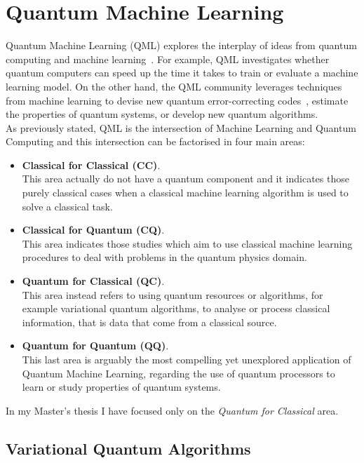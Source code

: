\chapter{Quantum Machine Learning}

Quantum Machine Learning (QML) explores the interplay of ideas from quantum computing and
machine learning~\cite{Biamonte_2017}.
For example, QML investigates whether quantum computers can speed up the time it takes
to train or evaluate a machine learning model. On the other hand, the QML community
leverages techniques from machine learning to devise new quantum error-correcting codes~\cite{Roffe_2019}, 
estimate the properties of quantum systems, or develop new quantum algorithms.\\
As previously stated, QML is the intersection of Machine Learning and Quantum Computing and this intersection can be 
factorised in four main areas:


\begin{itemize}
    \item \textbf{Classical for Classical (CC)}.\\ This area actually do not have a quantum component and 
    it indicates those purely classical cases when a classical machine learning algorithm is used to solve 
    a classical task.
    \item \textbf{Classical for Quantum (CQ)}.\\ This area indicates those studies which aim to use classical
    machine learning procedures to deal with problems in the quantum physics domain.
    \item \textbf{Quantum for Classical (QC)}.\\ This area instead refers to using quantum resources or algorithms, 
    for example variational quantum algorithms, to analyse or process classical information, 
    that is data that come from a classical source.
    \item \textbf{Quantum for Quantum (QQ)}.\\ This last area is arguably the most compelling yet unexplored
    application of Quantum Machine Learning, regarding the use of quantum processors to
    learn or study properties of quantum systems.
\end{itemize}

In my Master's thesis I have focused only on the \textit{Quantum for Classical} area.\\

\section{Variational Quantum Algorithms}


